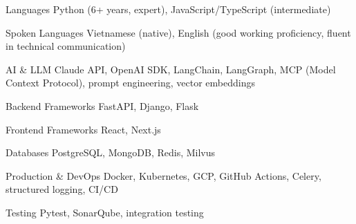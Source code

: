 

\begin{cvskills}

    \cvskill
    {Languages} %
    {Python (6+ years, expert), JavaScript/TypeScript (intermediate)} %

    \cvskill
    {Spoken Languages} %
    {Vietnamese (native), English (good working proficiency, fluent in technical communication)} %

    \cvskill
    {AI \& LLM} %
    {Claude API, OpenAI SDK, LangChain, LangGraph, MCP (Model Context Protocol), prompt engineering, vector embeddings} %

    \cvskill
    {Backend Frameworks} %
    {FastAPI, Django, Flask} %

    \cvskill
    {Frontend Frameworks} %
    {React, Next.js} %

    \cvskill
    {Databases} %
    {PostgreSQL, MongoDB, Redis, Milvus} %

    \cvskill
    {Production \& DevOps} %
    {Docker, Kubernetes, GCP, GitHub Actions, Celery, structured logging, CI/CD} %

    \cvskill
    {Testing} %
    {Pytest, SonarQube, integration testing} %


\end{cvskills}
